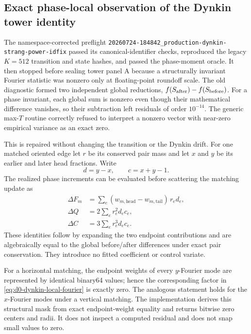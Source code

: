 \documentclass[11pt]{article}
\numberwithin{equation}{section}
\newcommand{\1}{\mathbf 1}
\begin{document}
\subsection{Exact phase-local observation of the Dynkin tower identity}
\label{sec:d0-jacobi-dynkin-phase-observer}

The namespace-corrected preflight
\nolinkurl{20260724-184842_production-dynkin-strang-power-idfix}
passed its canonical-identifier checks, reproduced the legacy \(K=512\)
transition and state hashes, and passed the phase-moment oracle.  It then
stopped before sealing tower panel A because a structurally invariant
Fourier statistic was nonzero only at floating-point roundoff scale.  The
old diagnostic formed two independent global reductions,
\(f(S_{\rm after})-f(S_{\rm before})\).  For a phase invariant, each global
sum is nonzero even though their mathematical difference vanishes, so
their subtraction left residuals of order \(10^{-14}\).  The generic
max-\(T\) routine correctly refused to interpret a nonzero vector with
near-zero empirical variance as an exact zero.

This is repaired without changing the transition or the Dynkin drift.
For one matched oriented edge let \(r\) be its conserved pair mass and let
\(x\) and \(y\) be its earlier and later head fractions.  Write
\[
  d=y-x,\qquad c=x+y-1.
\]
The realized phase increments can be evaluated before scattering the
matching update as
\begin{align}
  \Delta F_m
  &=
  \sum_e
  (w_{m,\mathrm{head}}-w_{m,\mathrm{tail}})\,r_e d_e,
  \label{eq:d0-dynkin-local-fourier}\\
  \Delta Q
  &=
  2\sum_e r_e^2d_ec_e,
  \label{eq:d0-dynkin-local-quadratic}\\
  \Delta C
  &=
  3\sum_e r_e^3d_ec_e.
  \label{eq:d0-dynkin-local-cubic}
\end{align}
These identities follow by expanding the two endpoint contributions and
are algebraically equal to the global before/after differences under exact
pair conservation.  They introduce no fitted coefficient or control
variate.

For a horizontal matching, the endpoint weights of every \(y\)-Fourier
mode are represented by identical binary64 values; hence the corresponding
factor in \eqref{eq:d0-dynkin-local-fourier} is exactly zero.  The analogous
statement holds for the \(x\)-Fourier modes under a vertical matching.
The implementation derives this structural mask from exact endpoint-weight
equality and returns bitwise zero centers and radii.  It does not inspect a
computed residual and does not snap small values to zero.
\end{document}
